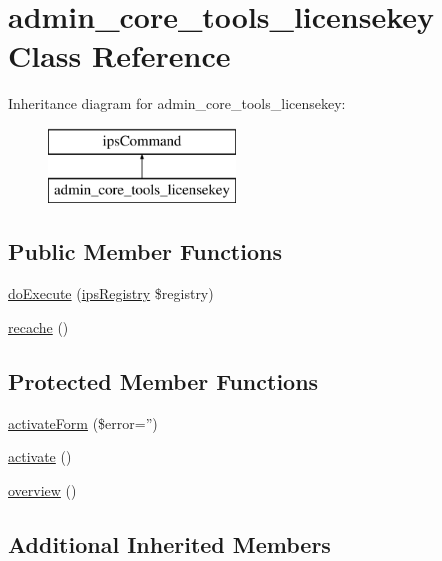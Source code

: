 \hypertarget{classadmin__core__tools__licensekey}{\section{admin\-\_\-core\-\_\-tools\-\_\-licensekey Class Reference}
\label{classadmin__core__tools__licensekey}
}
Inheritance diagram for admin\-\_\-core\-\_\-tools\-\_\-licensekey\-:\begin{figure}[H]
\begin{center}
\leavevmode
\includegraphics[height=2.000000cm]{classadmin__core__tools__licensekey}
\end{center}
\end{figure}
\subsection*{Public Member Functions}
\begin{DoxyCompactItemize}
\item 
\hyperlink{classadmin__core__tools__licensekey_afbc4e912a0604b94d47d66744c64d8ba}{do\-Execute} (\hyperlink{classips_registry}{ips\-Registry} \$registry)
\item 
\hyperlink{classadmin__core__tools__licensekey_ab49df93f487ef226eb36bd8f348cf14a}{recache} ()
\end{DoxyCompactItemize}
\subsection*{Protected Member Functions}
\begin{DoxyCompactItemize}
\item 
\hyperlink{classadmin__core__tools__licensekey_af4b30ccec0dbb591283da121f5b6aee8}{activate\-Form} (\$error='')
\item 
\hyperlink{classadmin__core__tools__licensekey_af77f85c4b8f7ae6e8ecc3e0ad2ceb350}{activate} ()
\item 
\hyperlink{classadmin__core__tools__licensekey_a605d77b075a42b540e2fa25bc3db9045}{overview} ()
\end{DoxyCompactItemize}
\subsection*{Additional Inherited Members}


